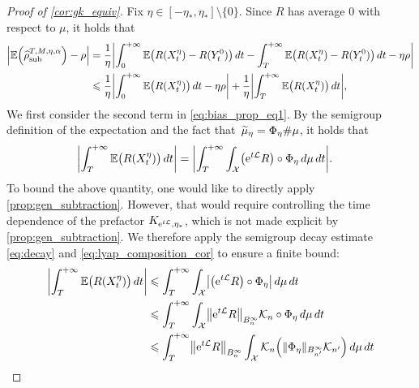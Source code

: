 \begin{proof}[Proof of \cref{cor:gk_equiv}]
	Fix $\eta \in [-\eta_*, \eta_*] \setminus \{0\}$. Since $R$ has average 0 with respect to $\mu$, it holds that
	\begin{align}
		\left|\E\paren*{\aTSest} - \rho\right| &= \frac{1}{\eta}\abs*{\int_0^{+\infty} \E\bigl(R(X^\eta_t) - R(Y^0_t)\bigr) \, dt - \int_T^{+\infty} \E\bigl(R(X^\eta_t) - R(Y^0_t)\bigr) \, dt - \eta\rho} \\
		&\leq \frac{1}{\eta}\abs*{\int_0^{+\infty} \E\bigl(R(X^\eta_t)\bigr) \, dt - \eta\rho} + \frac{1}{\eta}\abs*{\int_T^{+\infty} \E\bigl(R(X^\eta_t)\bigr) \, dt},
		\label{eq:bias_prop_eq1}
	\end{align}
	 We first consider the second term in \eqref{eq:bias_prop_eq1}. By the semigroup definition of the expectation and the fact that~$\widetilde{\mu}_\eta = \Phi_\eta\#\mu$, it holds that
	\begin{align}
		\abs*{\int_T^{+\infty} \E\bigl(R(X^\eta_t)\bigr) \, dt} &= \abs*{\int_T^{+\infty} \int_\mathcal{X} \bigl(\e^{t\L} R\bigr) \circ \Phi_\eta \, d\mu \, dt}.
		\label{eq:trunc_bias_eq}
	\end{align}
To bound the above quantity, one would like to directly apply \cref{prop:gen_subtraction}. However, that would require controlling the time dependence of the prefactor $K_{\mathrm{e}^{t\mathcal{L}},\eta_*}$, which is not made explicit by \cref{prop:gen_subtraction}. We therefore apply the semigroup decay estimate \eqref{eq:decay} and \eqref{eq:lyap_composition_cor} to ensure a finite bound:
	\begin{align}
		\abs*{\int_T^{+\infty} \E\bigl(R(X^\eta_t)\bigr) \, dt} &\leq \int_T^{+\infty} \int_\mathcal{X} \abs*{\bigl(\e^{t\L} R\bigr) \circ \Phi_\eta} \, d\mu \, dt \\
		&\leq \int_T^{+\infty} \int_\mathcal{X} \norm*{\e^{t\L} R}_{B^\infty_n} \mathcal{K}_n \circ \Phi_\eta \, d\mu \, dt \\
		&\leq \int_T^{+\infty} \norm*{\e^{t\L} R}_{B^\infty_n} \int_\mathcal{X} \mathcal{K}_n\paren*{\norm{\Phi_\eta}_{B^\infty_{n'}} \mathcal{K}_{n'}} \, d\mu \, dt \\

\end{align}
\end{proof}
